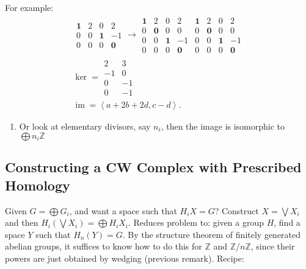 For example:
\begin{align*}
\begin{matrix}
\mathbf1&2&0&2\\0&0&\mathbf1&-1\\0&0&0&\mathbf0
\end{matrix} 
\to
\begin{matrix}
\mathbf1&2&0&2\\0&\mathbf0&0&0\\0&0&\mathbf1&-1\\0&0&0&\mathbf0
\end{matrix}
\begin{matrix}
\mathbf1&2&0&2\\0&\mathbf0&0&0\\0&0&\mathbf1&-1\\0&0&0&\mathbf0
\end{matrix} \\
\ker = 
\begin{matrix}
2\\-1\\0\\0
\end{matrix} 
\begin{matrix}
3\\0\\-1\\-1
\end{matrix}\\
\operatorname{im}= \left\langle{a+2b+2d,c-d}\right\rangle
.\end{align*}

\begin{enumerate}
\def\labelenumi{\arabic{enumi}.}
\setcounter{enumi}{5}
\tightlist
\item
  Or look at elementary divisors, say \(n_{i}\), then the image is
  isomorphic to \(\bigoplus n_{i} {\mathbb{Z}}\)
\end{enumerate}

\hypertarget{constructing-a-cw-complex-with-prescribed-homology}{%
\subsection{Constructing a CW Complex with Prescribed
Homology}\label{constructing-a-cw-complex-with-prescribed-homology}}

Given \(G = \bigoplus G_{i}\), and want a space such that
\(H_{i} X = G\)? Construct \(X = \bigvee X_{i}\) and then
\(H_{i} (\bigvee X_{i}) = \bigoplus H_{i} X_{i}\). Reduces problem to:
given a group \(H\), find a space \(Y\) such that \(H_{n}(Y) = G\). By
the structure theorem of finitely generated abelian groups, it suffices
to know how to do this for \({\mathbb{Z}}\) and
\({\mathbb{Z}}/n{\mathbb{Z}}\), since their powers are just obtained by
wedging (previous remark). Recipe:

